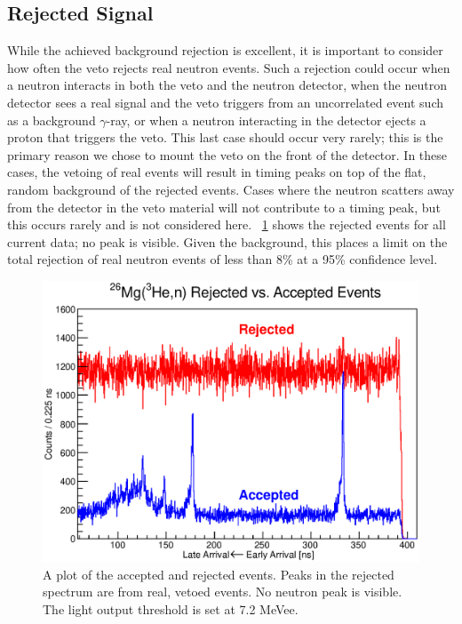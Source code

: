 \subsection{Rejected Signal}

While the achieved background rejection is excellent, it is important to consider how often the veto rejects real neutron events.  Such a rejection could occur when a neutron interacts in both the veto and the neutron detector, when the neutron detector sees a real signal and the veto triggers from an uncorrelated event such as a background $\gamma$-ray, or when a neutron interacting in the detector ejects a proton that triggers the veto.  This last case should occur very rarely; this is the primary reason we chose to mount the veto on the front of the detector.    In these cases, the vetoing of real events will result in timing peaks on top of the flat, random background of the rejected events.  Cases where the neutron scatters away from the detector in the veto material will not contribute to a timing peak, but this occurs rarely and is not considered here.  {\fig}~\ref{fig:rejectionTOF} shows the rejected events for all current  data; no peak is visible.  Given the background, this places a limit on the total rejection of real neutron events of less than 8\% at a 95\% confidence level.  
\begin{figure}[!htbp]
\centering
\includegraphics[width=5in]{figures/26Mg_rejection_newEnergyCut.eps}
\caption{\label{fig:rejection}A plot of the accepted and rejected events.  Peaks in the rejected spectrum are from real, vetoed events.  No neutron peak is visible.  The light output threshold is set at 7.2 MeVee.}
\label{fig:rejectionTOF}
\end{figure}


